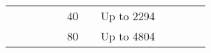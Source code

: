 \documentclass{article}
\begin{document}
\begin{latin}
\begin{table}[H]
{\begin{tabular}{|cccccccccccc|}
\multicolumn{1}{|c|}{}                                                                                               & \multicolumn{1}{c|}{}                              & \multicolumn{1}{c|}{}                                                                                          & \multicolumn{1}{c|}{}                                                                                 & \multicolumn{1}{c|}{}                                                                                    & \multicolumn{1}{c|}{40}                                                                                  & \multicolumn{1}{c|}{}                                                                                              & \multicolumn{1}{c|}{Up to 2294}                                                                                                                          & \multicolumn{1}{c|}{}                                                                                           & \multicolumn{1}{c|}{}                                                                                            & \multicolumn{1}{c|}{}                                 &                                   \\ \cline{6-6} \cline{8-8}
\multicolumn{1}{|c|}{}                                                                                               & \multicolumn{1}{c|}{}                              & \multicolumn{1}{c|}{}                                                                                          & \multicolumn{1}{c|}{}                                                                                 & \multicolumn{1}{c|}{}                                                                                    & \multicolumn{1}{c|}{80}                                                                                  & \multicolumn{1}{c|}{}                                                                                              & \multicolumn{1}{c|}{Up to 4804}                                                                                                                          & \multicolumn{1}{c|}{}                                                                                           & \multicolumn{1}{c|}{}                                                                                            & \multicolumn{1}{c|}{}                                 &                                   \\ \cline{6-6} \cline{8-8}

\end{tabular}}
\end{table}
\end{latin}
\end{document}
